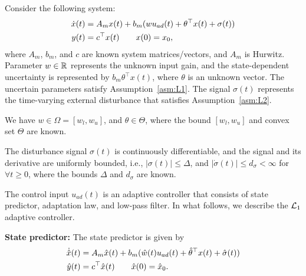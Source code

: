 \documentclass[letterpaper, 10 pt, conference]{ieeeconf}
\begin{document}
Consider the following system:
\begin{align}
    \dot{x}(t) &= A_m x(t) + b_m (w u_{ad}(t)+ \theta^\top x(t)+ \sigma(t)) \nonumber\\
    y(t)&=c^\top x(t) \quad \quad x(0)=x_0,
    \label{eq:l1dynamic}
\end{align}
where $A_m$, $b_m$, and $c$ are known system matrices/vectors, and $A_m$ is Hurwitz.
Parameter $w \in \mathbb{R}$ represents the unknown input gain, and the state-dependent uncertainty is represented by $b_m \theta^\top x(t)$, where $\theta$ is an unknown vector. The uncertain parameters satisfy Assumption~\ref{asm:L1}.
The signal $\sigma(t)$ represents the time-varying external disturbance that satisfies Assumption~\ref{asm:L2}.
\begin{assumption}
We have $w \in \Omega = [w_l,w_u]$, and $\theta \in \Theta$,  where the bound $[w_l,w_u]$ and convex set $\Theta$ are known.
\label{asm:L1}
\end{assumption}
\begin{assumption}
The disturbance signal $\sigma(t)$ is continuously differentiable, and the signal and its derivative are uniformly bounded, i.e.,
$|\sigma(t)|\leq\Delta$, and $|\dot{\sigma}(t)|\leq d_\sigma<\infty$ for $\forall t\geq0$, where the bounds $\Delta$ and $d_\sigma$ are known.
\label{asm:L2}
\end{assumption}
The control input $u_{ad}(t)$ is an adaptive controller that consists of state predictor, adaptation law, and low-pass filter.
In what follows, we describe the $\mathcal{L}_1$ adaptive controller.


\textbf{State predictor:}
The state predictor is given by
\begin{align*}
    \dot{\hat{x}}(t) &= A_m\hat{x}(t)+b_m(\hat{w}(t)u_{ad}(t)+\hat{\theta}^\top x(t)+\hat{\sigma}(t))\nonumber\\
    \hat{y}(t)&=c^\top\hat{x}(t) \quad \quad  \hat{x}(0)=\hat{x}_0.
\end{align*}
\end{document}
